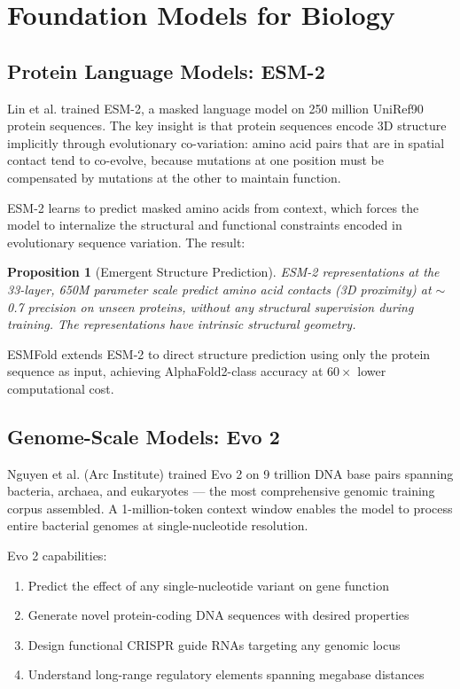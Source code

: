 \documentclass[11pt]{article}
\newtheorem{proposition}{Proposition}
\begin{document}
\section{Foundation Models for Biology}

\subsection{Protein Language Models: ESM-2}

Lin et al. \citep{lin2023evolutionary} trained ESM-2, a masked language model on 250 million UniRef90 protein sequences. The key insight is that protein sequences encode 3D structure implicitly through evolutionary co-variation: amino acid pairs that are in spatial contact tend to co-evolve, because mutations at one position must be compensated by mutations at the other to maintain function.

ESM-2 learns to predict masked amino acids from context, which forces the model to internalize the structural and functional constraints encoded in evolutionary sequence variation. The result:

\begin{proposition}[Emergent Structure Prediction]
ESM-2 representations at the 33-layer, 650M parameter scale predict amino acid contacts (3D proximity) at $\sim$0.7 precision on unseen proteins, without any structural supervision during training. The representations have intrinsic structural geometry.
\end{proposition}

ESMFold extends ESM-2 to direct structure prediction using only the protein sequence as input, achieving AlphaFold2-class accuracy at $60\times$ lower computational cost.

\subsection{Genome-Scale Models: Evo 2}

Nguyen et al. \citep{nguyen2024evo2} (Arc Institute) trained Evo 2 on 9 trillion DNA base pairs spanning bacteria, archaea, and eukaryotes --- the most comprehensive genomic training corpus assembled. A 1-million-token context window enables the model to process entire bacterial genomes at single-nucleotide resolution.

Evo 2 capabilities:
\begin{enumerate}
\item Predict the effect of any single-nucleotide variant on gene function
\item Generate novel protein-coding DNA sequences with desired properties
\item Design functional CRISPR guide RNAs targeting any genomic locus
\item Understand long-range regulatory elements spanning megabase distances
\end{enumerate}
\end{document}
